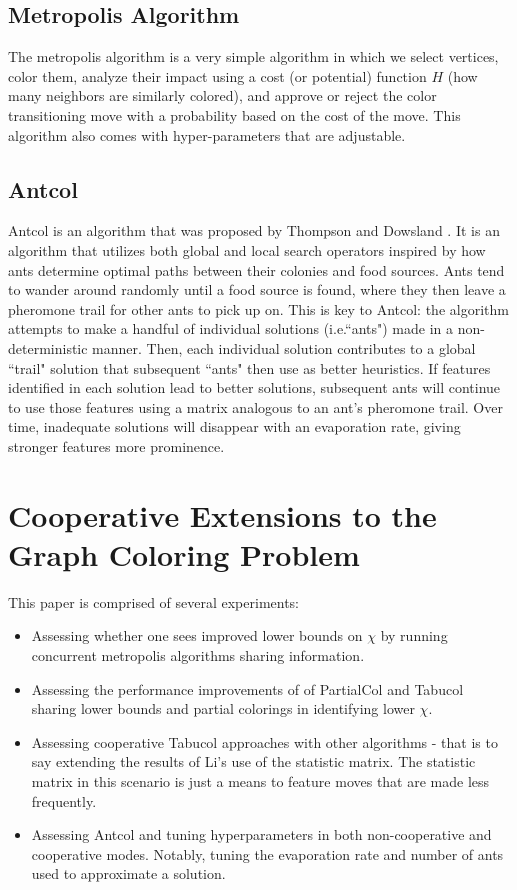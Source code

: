 \documentclass[runningheads]{llncs}
\begin{document}
\subsection{Metropolis Algorithm}
The metropolis algorithm is a very simple algorithm in which we select vertices, color them, analyze their impact using a cost (or potential) function $H$ (how many neighbors are similarly colored), and approve or reject the color transitioning move with a probability based on the cost of the move. This algorithm also comes with hyper-parameters that are adjustable.

\subsection{Antcol}

Antcol is an algorithm that was proposed by Thompson and Dowsland \cite{ant_kj}. It is an algorithm that utilizes both global and local search operators inspired by how ants determine optimal paths between their colonies and food sources. Ants tend to wander around randomly until a food source is found, where they then leave a pheromone trail for other ants to pick up on. This is key to Antcol: the algorithm attempts to make a handful of individual solutions (i.e.``ants") made in a non-deterministic manner. Then, each individual solution contributes to a global ``trail" solution that subsequent ``ants" then use as better heuristics. If features identified in each solution lead to better solutions, subsequent ants will continue to use those features using a matrix analogous to an ant's pheromone trail. Over time, inadequate solutions will disappear with an evaporation rate, giving stronger features more prominence.

\section{Cooperative Extensions to the Graph Coloring Problem}

This paper is comprised of several experiments:

\begin{itemize}

  \item Assessing whether one sees improved lower bounds on $\chi$ by running concurrent metropolis algorithms sharing information.
  \item Assessing the performance improvements of of PartialCol and Tabucol sharing lower bounds and partial colorings in identifying lower $\chi$.
  \item Assessing cooperative Tabucol approaches with other algorithms - that is to say extending the results of Li's use of the statistic matrix. \cite{https://doi.org/10.5445/ir/1000083192} The statistic matrix in this scenario is just a means to feature moves that are made less frequently.
  \item Assessing Antcol and tuning hyperparameters in both non-cooperative and cooperative modes. Notably, tuning the evaporation rate and number of ants used to approximate a solution.
\end{itemize}
\end{document}
